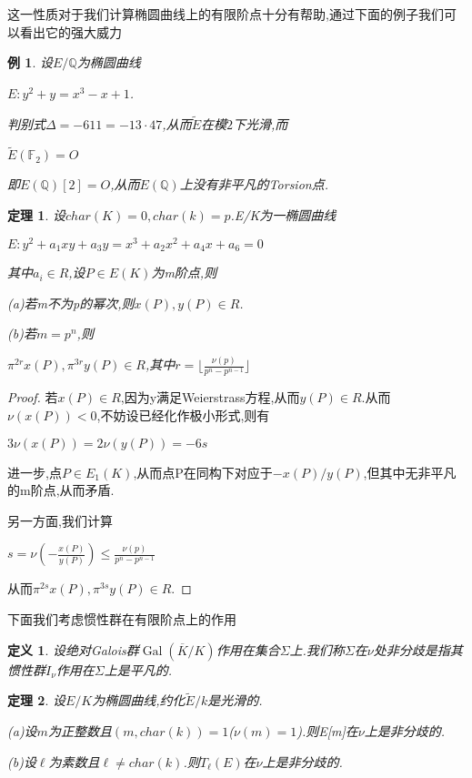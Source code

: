 \documentclass[11pt]{ctexart}
\DeclareMathOperator{\Gal}{Gal}
\newtheorem{thm}{定理}[section]
\newtheorem{defi}{定义}[section]
\newtheorem{exm}{例}[section]
\begin{document}
这一性质对于我们计算椭圆曲线上的有限阶点十分有帮助,通过下面的例子我们可以看出它的强大威力
\begin{exm}设$E/\mathbb{Q}$为椭圆曲线
    \begin{center}
        $E:y^2+y=x^3-x+1$.
    \end{center}
    判别式$\Delta=-611=-13\cdot 47$,从而$\widetilde{E}$在模$2$下光滑,而
       \begin{center}
        $\widetilde{E}(\mathbb{F}_2)={O}$
       \end{center}
    即$E(\mathbb{Q})[2]={O}$,从而$E(\mathbb{Q})$上没有非平凡的Torsion点.
\end{exm}
\begin{thm}设$char(K)=0$$,char(k)=p$.E/K为一椭圆曲线
\begin{center}
    $E:y^2+a_1xy+a_3y=x^3+a_2x^2+a_4x+a_6=0$
\end{center}
其中$a_i \in R$,设$P\in E(K)$为m阶点,则

(a)若m不为p的幂次,则$x(P),y(P)\in R$.

(b)若$m=p^n$,则
\begin{center}
    $\pi^{2r}x(P),\pi^{3r}y(P)\in R$,其中$r=\lfloor\frac{\nu (p)}{p^n-p^{n-1}} \rfloor $
\end{center}
\end{thm}
\begin{proof}若$x(P)\in R$,因为y满足Weierstrass方程,从而$y(P)\in R$.从而$\nu(x(P))<0$,不妨设已经化作极小形式,则有
\begin{center}
    $3\nu(x(P))=2\nu(y(P))=-6s$
\end{center}
进一步,点$P\in E_1(K)$,从而点P在同构下对应于$-x(P)/y(P)$,但其中无非平凡的m阶点,从而矛盾.

另一方面,我们计算
\begin{center}
    $s=\nu(-\frac{x(P)}{y(P)})\leqslant \frac{\nu(p)}{p^n-p^{n-1}}$
\end{center}
从而$\pi^{2s}x(P),\pi^{3s}y(P)\in R$.
\end{proof}
下面我们考虑惯性群在有限阶点上的作用

\begin{defi}设绝对Galois群$\Gal(\overline{K}/K)$作用在集合$\Sigma$上.我们称$\Sigma$在$\nu$处非分歧是指其惯性群$I_{\nu}$作用在$\Sigma$上是平凡的.

\end{defi}

\begin{thm}设$E/K$为椭圆曲线,约化$\widetilde{E}/k$是光滑的.

    (a)设$m$为正整数且$(m,char(k))=1$($\nu(m)=1$).则\textup{E[m]}在$\nu$上是非分歧的.

    (b)设$\ell$为素数且$\ell\neq char(k)$.则$T_{\ell}(E)$在$\nu$上是非分歧的.

\end{thm}
\end{document}
